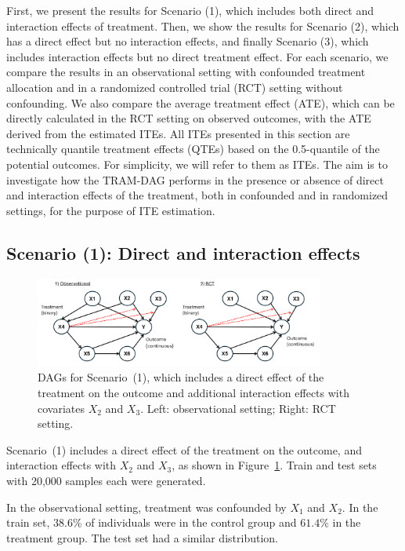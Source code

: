 First, we present the results for Scenario (1), which includes both direct and interaction effects  of treatment. Then, we show the results for Scenario (2), which has a direct effect but no interaction effects, and finally Scenario (3), which includes interaction effects but no direct treatment effect. For each scenario, we compare the results in an observational setting with confounded treatment allocation and in a randomized controlled trial (RCT) setting without confounding. We also compare the average treatment effect (ATE), which can be directly calculated in the RCT setting on observed outcomes, with the ATE derived from the estimated ITEs. All ITEs presented in this section are technically quantile treatment effects (QTEs) based on the 0.5-quantile of the potential outcomes. For simplicity, we will refer to them as ITEs. The aim is to investigate how the TRAM-DAG performs in the presence or absence of direct and interaction effects of the treatment, both in confounded and in randomized settings, for the purpose of ITE estimation.

\subsection{Scenario (1): Direct and interaction effects} 


\begin{figure}[H]
\centering
\includegraphics[width=0.85\textwidth]{img/exp4_dags.png}
\caption{DAGs for Scenario~(1), which includes a direct effect of the treatment on the outcome and additional interaction effects with covariates $X_2$ and $X_3$. Left: observational setting; Right: RCT setting.}
\label{fig:ite_dag_observational_1}
\end{figure}

Scenario~(1) includes a direct effect of the treatment on the outcome, and interaction effects with $X_2$ and $X_3$, as shown in Figure~\ref{fig:ite_dag_observational_1}. Train and test sets with 20,000 samples each were generated.

In the observational setting, treatment was confounded by $X_1$ and $X_2$. In the train set, $38.6$\% of individuals were in the control group and $61.4$\% in the treatment group. The test set had a similar distribution.

